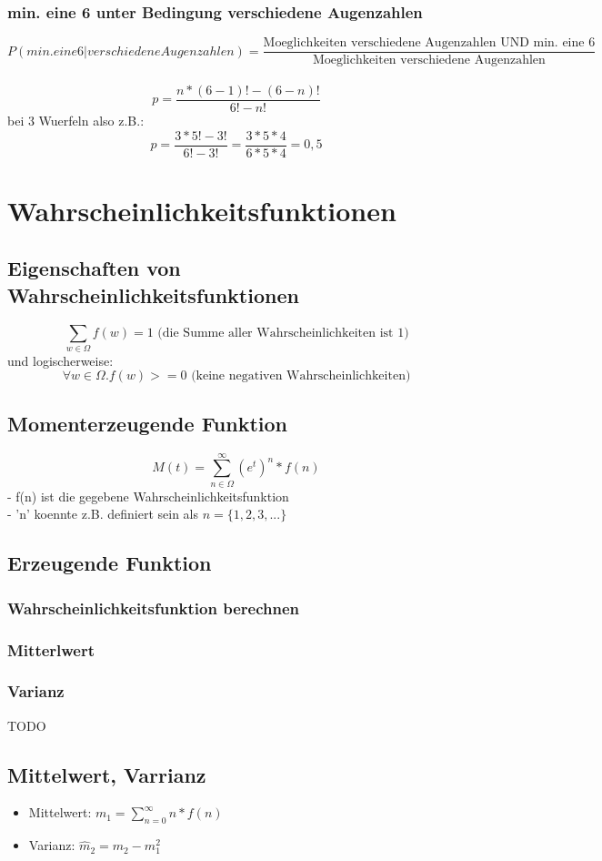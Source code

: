 \documentclass{article}
\begin{document}
\subsubsection{min. eine 6 unter Bedingung verschiedene Augenzahlen}
\[
	P(min. eine 6|verschiedene Augenzahlen) = \frac{\text{Moeglichkeiten verschiedene Augenzahlen UND min. eine 6}}{\text{Moeglichkeiten verschiedene Augenzahlen}}
\]\\
\[
	p=\frac{n*(6-1)!-(6-n)!}{6!-n!} 
\]
bei 3 Wuerfeln also z.B.:\[
	p=\frac{3*5!-3!}{6!-3!} = \frac{3*5*4}{6*5*4} = 0,5
\]

\section{Wahrscheinlichkeitsfunktionen}
\subsection{Eigenschaften von Wahrscheinlichkeitsfunktionen}
\[ \sum_{w \in \Omega} f(w) = 1 \text{ (die Summe aller Wahrscheinlichkeiten ist 1)}\]
und logischerweise:
\[ \forall w\in\Omega . f(w)>=0 \text{ (keine negativen Wahrscheinlichkeiten)} \]
\subsection{Momenterzeugende Funktion}
\[
	M(t)=\sum_{n\in\Omega}^{\infty}(e^t)^n * f(n)
\]
- f(n) ist die gegebene Wahrscheinlichkeitsfunktion\\
- 'n' koennte z.B. definiert sein als $n=\{1,2,3,...\}$
\subsection{Erzeugende Funktion}
\subsubsection{Wahrscheinlichkeitsfunktion berechnen}
\subsubsection{Mitterlwert}
\subsubsection{Varianz}
TODO
\subsection{Mittelwert, Varrianz}
\begin{itemize}
	\item Mittelwert: $m_1 = \sum_{n=0}^\infty n*f(n)$
	\item Varianz: $\widehat{m}_2 = m_2 - m_1^2$
\end{itemize}
\end{document}
